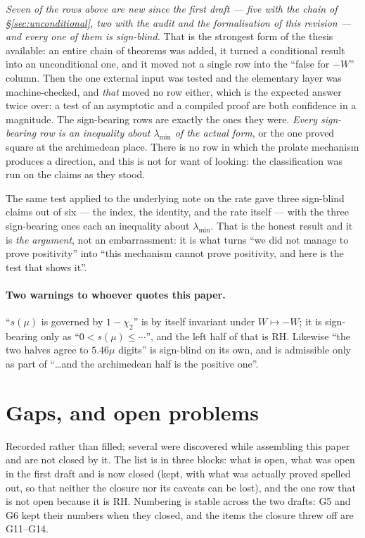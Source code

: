 \documentclass[11pt,a4paper]{article}
\theoremstyle{plain}
\theoremstyle{definition}
\theoremstyle{remark}
\begin{document}
\emph{Seven of the rows above are new since the first draft --- five with the
chain of \S\ref{sec:unconditional}, two with the audit and the formalisation of
this revision --- and every one of them is sign-blind.}  That is the strongest
form of the thesis available: an entire
chain of theorems was added, it turned a conditional result into an
unconditional one, and it moved not a single row into the ``false for $-W$''
column.  Then the one external input was tested and the elementary layer was
machine-checked, and \emph{that} moved no row either, which is the expected
answer twice over: a test of an asymptotic and a compiled proof are both
confidence in a magnitude.  The sign-bearing rows are exactly the ones they were.
\emph{Every sign-bearing row is an inequality about $\lambda_{\min}$ of the
actual form}, or the one proved square at the archimedean place.  There is no row
in which the prolate mechanism produces a direction, and this is not for want of
looking: the classification was run on the claims as they stood.

The same test applied to the underlying note on the rate gave three sign-blind
claims out of six --- the index, the identity, and the rate itself --- with the
three sign-bearing ones each an inequality about $\lambda_{\min}$.  That is the
honest result and it is \emph{the argument}, not an embarrassment: it is what
turns ``we did not manage to prove positivity'' into ``this mechanism cannot
prove positivity, and here is the test that shows it''.

\paragraph{Two warnings to whoever quotes this paper.}
``$s(\mu)$ is governed by $1-\chi_2$'' is by itself invariant under
$W\mapsto-W$; it is sign-bearing only as ``$0<s(\mu)\le\cdots$'', and the left
half of that is RH.  Likewise ``the two halves agree to $5.46\mu$ digits'' is
sign-blind on its own, and is admissible only as part of ``\ldots and the
archimedean half is the positive one''.

\section{Gaps, and open problems}
\label{sec:gaps}

Recorded rather than filled; several were discovered while assembling this paper
and are not closed by it.  The list is in three blocks: what is open, what was
open in the first draft and is now closed (kept, with what was actually proved
spelled out, so that neither the closure nor its caveats can be lost), and the
one row that is not open because it is RH.  Numbering is stable across the two
drafts: G5 and G6 kept their numbers when they closed, and the items the closure
threw off are G11--G14.
\end{document}
